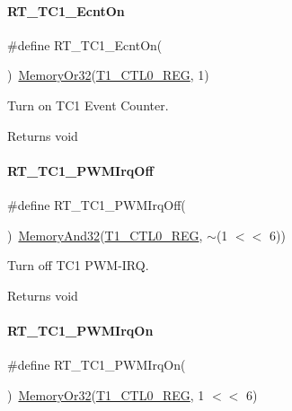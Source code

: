 \paragraph{\texorpdfstring{R\+T\+\_\+\+T\+C1\+\_\+\+Ecnt\+On}{RT\_TC1\_EcntOn}}
{\footnotesize\ttfamily \#define R\+T\+\_\+\+T\+C1\+\_\+\+Ecnt\+On(\begin{DoxyParamCaption}{ }\end{DoxyParamCaption})~\mbox{\hyperlink{a00020_a27874a97deab7cecdde5ddecf466e31e}{Memory\+Or32}}(\mbox{\hyperlink{a00020_a55600694c3c73a1019f78d306f474fa1}{T1\+\_\+\+C\+T\+L0\+\_\+\+R\+EG}}, 1)}



Turn on T\+C1 Event Counter. 

\begin{DoxyReturn}{Returns}
void 
\end{DoxyReturn}
\mbox{\label{a00044_a1c33903adfe470964d7eb5126c4ce7d4}} 
\paragraph{\texorpdfstring{R\+T\+\_\+\+T\+C1\+\_\+\+P\+W\+M\+Irq\+Off}{RT\_TC1\_PWMIrqOff}}
{\footnotesize\ttfamily \#define R\+T\+\_\+\+T\+C1\+\_\+\+P\+W\+M\+Irq\+Off(\begin{DoxyParamCaption}{ }\end{DoxyParamCaption})~\mbox{\hyperlink{a00020_ad87cedffcaadc51db22594fce55173d4}{Memory\+And32}}(\mbox{\hyperlink{a00020_a55600694c3c73a1019f78d306f474fa1}{T1\+\_\+\+C\+T\+L0\+\_\+\+R\+EG}}, $\sim$(1 $<$$<$ 6))}



Turn off T\+C1 P\+W\+M-\/\+I\+RQ. 

\begin{DoxyReturn}{Returns}
void 
\end{DoxyReturn}
\mbox{\label{a00044_a61477182241a8629176801cca44ce09a}} 
\paragraph{\texorpdfstring{R\+T\+\_\+\+T\+C1\+\_\+\+P\+W\+M\+Irq\+On}{RT\_TC1\_PWMIrqOn}}
{\footnotesize\ttfamily \#define R\+T\+\_\+\+T\+C1\+\_\+\+P\+W\+M\+Irq\+On(\begin{DoxyParamCaption}{ }\end{DoxyParamCaption})~\mbox{\hyperlink{a00020_a27874a97deab7cecdde5ddecf466e31e}{Memory\+Or32}}(\mbox{\hyperlink{a00020_a55600694c3c73a1019f78d306f474fa1}{T1\+\_\+\+C\+T\+L0\+\_\+\+R\+EG}}, 1 $<$$<$ 6)}



